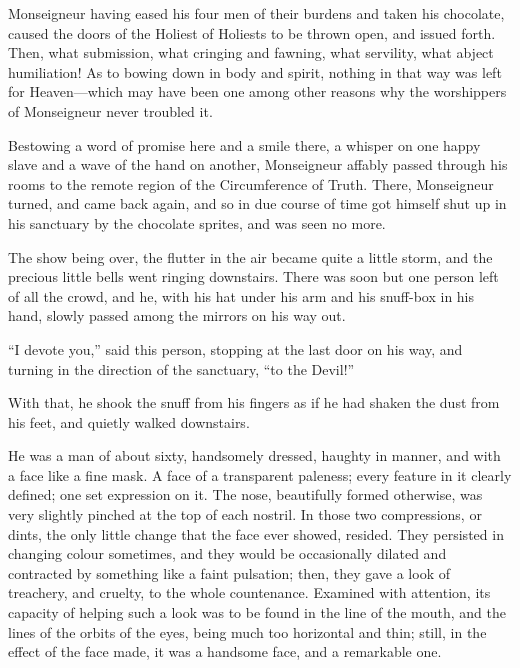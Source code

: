 Monseigneur having eased his four men of their burdens and taken his
chocolate, caused the doors of the Holiest of Holiests to be thrown
open, and issued forth.  Then, what submission, what cringing and
fawning, what servility, what abject humiliation!  As to bowing down
in body and spirit, nothing in that way was left for Heaven---which
may have been one among other reasons why the worshippers of
Monseigneur never troubled it.

Bestowing a word of promise here and a smile there, a whisper on one
happy slave and a wave of the hand on another, Monseigneur affably
passed through his rooms to the remote region of the Circumference of
Truth.  There, Monseigneur turned, and came back again, and so in due
course of time got himself shut up in his sanctuary by the chocolate
sprites, and was seen no more.

The show being over, the flutter in the air became quite a little
storm, and the precious little bells went ringing downstairs.
There was soon but one person left of all the crowd, and he, with his
hat under his arm and his snuff-box in his hand, slowly passed among
the mirrors on his way out.

``I devote you,'' said this person, stopping at the last door on his
way, and turning in the direction of the sanctuary, ``to the Devil!''

With that, he shook the snuff from his fingers as if he had shaken
the dust from his feet, and quietly walked downstairs.

He was a man of about sixty, handsomely dressed, haughty in manner,
and with a face like a fine mask.  A face of a transparent paleness;
every feature in it clearly defined; one set expression on it.
The nose, beautifully formed otherwise, was very slightly pinched at
the top of each nostril.  In those two compressions, or dints, the
only little change that the face ever showed, resided.  They persisted
in changing colour sometimes, and they would be occasionally dilated
and contracted by something like a faint pulsation; then, they gave a
look of treachery, and cruelty, to the whole countenance.  Examined
with attention, its capacity of helping such a look was to be found
in the line of the mouth, and the lines of the orbits of the eyes,
being much too horizontal and thin; still, in the effect of the face
made, it was a handsome face, and a remarkable one.

